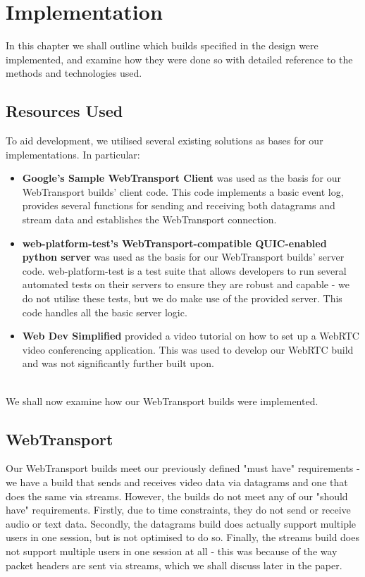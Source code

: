 
\chapter{Implementation}

In this chapter we shall outline which builds specified in the design were implemented, and examine how they were done so with detailed reference to the methods and technologies used. 

\section{Resources Used}
To aid development, we utilised several existing solutions as bases for our implementations. In particular:
\begin{itemize}
    \item \textbf{Google's Sample WebTransport Client} \cite{wt_js_client_sample} was used as the basis for our WebTransport builds' client code. This code implements a basic event log, provides several functions for sending and receiving both datagrams and stream data and establishes the WebTransport connection. 
    \item \textbf{web-platform-test's WebTransport-compatible QUIC-enabled python server} \cite{web-platform-tests} was used as the basis for our WebTransport builds' server code. web-platform-test is a test suite that allows developers to run several automated tests on their servers to ensure they are robust and capable - we do not utilise these tests, but we do make use of the provided server. This code handles all the basic server logic.
    \item \textbf{Web Dev Simplified} \cite{web_dev_simplified} provided a video tutorial on how to set up a WebRTC video conferencing application. This was used to develop our WebRTC build and was not significantly further built upon.
\end{itemize}
\hfill{} \\
We shall now examine how our WebTransport builds were implemented.

\section{WebTransport}

Our WebTransport builds meet our previously defined "must have" requirements - we have a build that sends and receives video data via datagrams and one that does the same via streams. However, the builds do not meet any of our "should have" requirements. Firstly, due to time constraints, they do not send or receive audio or text data. Secondly, the datagrams build does actually support multiple users in one session, but is not optimised to do so. Finally, the streams build does not support multiple users in one session at all - this was because of the way packet headers are sent via streams, which we shall discuss later in the paper. 

